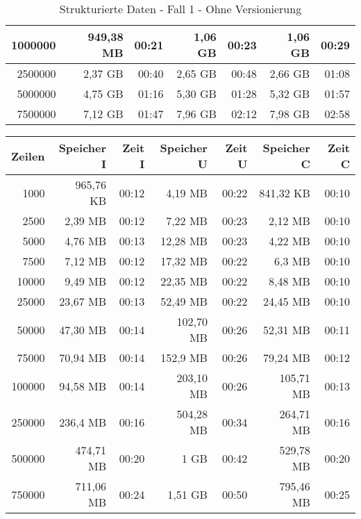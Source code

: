 \begin{table}[h!]
\begin{tabular}{|r|r|r|r|r|r|r|}
        1000000 & 949,38 MB & 00:21 & 1,06 GB   & 00:23 & 1,06 GB   & 00:29 \\ \hline
        2500000 & 2,37 GB   & 00:40 & 2,65 GB   & 00:48 & 2,66 GB   & 01:08 \\ \hline
        5000000 & 4,75 GB   & 01:16 & 5,30 GB   & 01:28 & 5,32 GB   & 01:57 \\ \hline
        7500000 & 7,12 GB   & 01:47 & 7,96 GB   & 02:12 & 7,98 GB   & 02:58 \\ \hline
    \end{tabular}
    \caption{Strukturierte Daten - Fall 1 - Ohne Versionierung}
    \label{tab:sql-80-20-40-updated}
\end{table}

\begin{table}[h!]
    \centering
    \begin{tabular}{|r|r|r|r|r|r|r|}
        \hline
        \textbf{Zeilen} & \textbf{Speicher I} & \textbf{Zeit I} & \textbf{Speicher U} & \textbf{Zeit U} & \textbf{Speicher C} & \textbf{Zeit C} \\ \hline
        1000    & 965,76 KB & 00:12 & 4,19 MB   & 00:22 & 841,32 KB & 00:10 \\ \hline
        2500    & 2,39 MB   & 00:12 & 7,22 MB	& 00:23 & 2,12 MB   & 00:10 \\ \hline
        5000    & 4,76 MB   & 00:13 & 12,28 MB	& 00:23 & 4,22 MB   & 00:10 \\ \hline
        7500    & 7,12 MB   & 00:12 & 17,32 MB	& 00:22 & 6,3 MB    & 00:10 \\ \hline
        10000   & 9,49 MB   & 00:12 & 22,35 MB	& 00:22 & 8,48 MB   & 00:10 \\ \hline
        25000   & 23,67 MB  & 00:13 & 52,49 MB	& 00:22 & 24,45 MB  & 00:10 \\ \hline
        50000   & 47,30 MB  & 00:14 & 102,70 MB & 00:26 & 52,31 MB  & 00:11 \\ \hline
        75000   & 70,94 MB  & 00:14 & 152,9 MB	& 00:26 & 79,24 MB  & 00:12 \\ \hline
        100000  & 94,58 MB  & 00:14 & 203,10 MB	& 00:26 & 105,71 MB & 00:13 \\ \hline
        250000  & 236,4 MB  & 00:16 & 504,28 MB	& 00:34 & 264,71 MB & 00:16 \\ \hline
        500000  & 474,71 MB & 00:20 & 1 GB     	& 00:42 & 529,78 MB & 00:20 \\ \hline
        750000  & 711,06 MB & 00:24 & 1,51 GB  	& 00:50 & 795,46 MB & 00:25 \\ \hline

\end{tabular}
\end{table}
